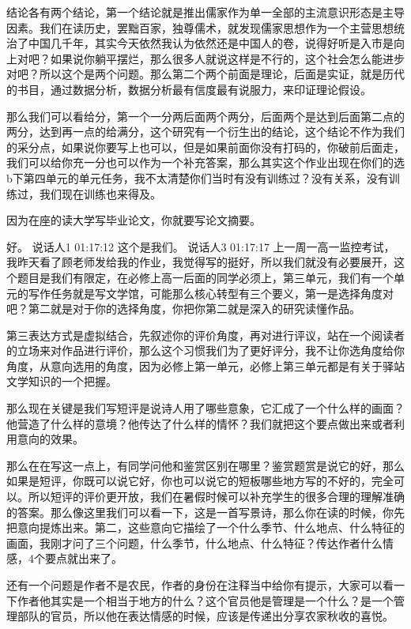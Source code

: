 \documentclass{ctexart}
\renewcommand{\\}{\par}
\begin{document}
结论各有两个结论，第一个结论就是推出儒家作为单一全部的主流意识形态是主导因素。我们在读历史，罢黜百家，独尊儒术，就发现儒家思想作为一个主营思想统治了中国几千年，其实今天依然我认为依然还是中国人的卷，说得好听是入市是向上对吧？如果说你躺平摆烂，那么很多人就说这样是不行的，这个社会怎么能进步对吧？所以这个是两个问题。那么第二个两个前面是理论，后面是实证，就是历代的书目，通过数据分析，数据分析最有信度最有说服力，来印证理论假设。

那么我们可以看给分，第一个一分两后面两个两分，后面两个是达到后面第二点的两分，达到再一点的给满分，这个研究有一个衍生出的结论，这个结论不作为我们的采分点，如果说你要写上也可以，但是如果前面你没有打码的，你破前后面走，我们可以给你充一分也可以作为一个补充答案，那么其实这个作业出现在你们的选b下第四单元的单元任务，我不太清楚你们当时有没有训练过？没有关系，没有训练过，我们现在训练也来得及。

因为在座的读大学写毕业论文，你就要写论文摘要。

好。
说话人1 01:17:12
这个是我们。
说话人3 01:17:17
上一周一高一监控考试，我昨天看了顾老师发给我的作业，我觉得写的挺好，所以我们就没有必要展开，这个题目是我们有限定，在必修上高一后面的同学必须上，第三单元，我们有一个单元的写作任务就是写文学馆，可能那么核心转型有三个要义，第一是选择角度对吧？第二就是对于你的选择角度，你把你第二就是深入的研究读懂作品。

第三表达方式是虚拟结合，先叙述你的评价角度，再对进行评议，站在一个阅读者的立场来对作品进行评价，那么这个习惯我们为了更好评分，我不让你选角度给你角度，从意向选用的角度，因为必修上第一单元，必修上第三单元都是有关于驿站文学知识的一个把握。

那么现在关键是我们写短评是说诗人用了哪些意象，它汇成了一个什么样的画面？他营造了什么样的意境？他传达了什么样的情怀？我们就把这个要点做出来或者利用意向的效果。

那么在在写这一点上，有同学问他和鉴赏区别在哪里？鉴赏题赏是说它的好，那么如果是短评，你既可以说它好，你也可以说它的短板哪些地方写的不好的，完全可以。所以短评的评价更开放，我们在暑假时候可以补充学生的很多合理的理解准确的答案。那么像这里我们可以看一下，这是一首写景诗，那么你在读的时候，你先把意向提炼出来。第二，这些意向它描绘了一个什么季节、什么地点、什么特征的画面，我刚才问了三个问题，什么季节，什么地点、什么特征？传达作者什么情感，4个要点就出来了。

还有一个问题是作者不是农民，作者的身份在注释当中给你有提示，大家可以看一下作者他其实是一个相当于地方的什么？这个官员他是管理是一个什么？是一个管理部队的官员，所以他在表达情感的时候，应该是传递出分享农家秋收的喜悦。
\end{document}
